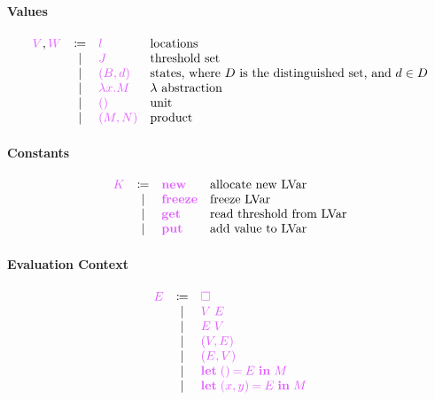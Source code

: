 \documentclass[main.tex]{subfiles}
\begin{document}
\paragraph{Values}
\[
\begin{array}{lcll}
  \tm{V}, \tm{W}
  & \coloneqq & \tm{l}                        & \text{locations} \\
  & \sep      & \tm{J}                        & \text{threshold set} \\
  & \sep      & \tm{(B, d)}                   & \text{states, where } D \text{
                                                is the distinguished set,
                                                and } d \in D\\
  & \sep      & \tm{\lambda x.M}              & \lambda \text{ abstraction} \\
  & \sep      & \tm{\unit}                    & \text{unit} \\
  & \sep      & \tm{\pair{M}{N}}              & \text{product} \\
\end{array}
\]

\paragraph{Constants}
\[
\begin{array}{lcll}
  \tm{K}
  & \coloneqq & \tm{\lvarnew}                 & \text{allocate new LVar} \\
  & \sep      & \tm{\lvarfreeze}              & \text{freeze LVar} \\
  & \sep      & \tm{\lvarget}                 & \text{read threshold from
                                                  LVar} \\
  & \sep      & \tm{\lvarput}                 & \text{add value to LVar} \\
\end{array}
\]

\paragraph{Evaluation Context}
\[
\begin{array}{lcll}
  \tm{E}
  & \coloneqq & \tm{\hole}                 \\
  & \sep      & \tm{V\; E}                 \\       
  & \sep      & \tm{E\; V}                 \\     
  & \sep      & \tm{(V, E)}                \\   
  & \sep      & \tm{(E, V)}                \\   
  & \sep      & \tm{\letunit{E}{M}}        \\                                                   
  & \sep      & \tm{\letpair{x}{y}{E}{M}}  \\   
\end{array}
\]
\end{document}
